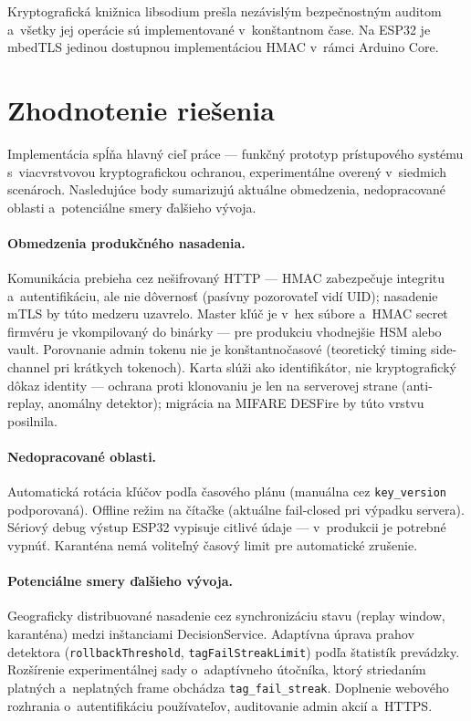 \documentclass[a4paper]{feidipsp}
\begin{document}
\noindent Kryptografická knižnica libsodium\cite{LibsodiumDoc} prešla nezávislým bezpečnostným auditom\cite{LibsodiumAudit} a~všetky jej operácie sú implementované v~konštantnom čase\cite{Bernstein2012}. Na ESP32 je mbedTLS jedinou dostupnou implementáciou HMAC v~rámci Arduino Core.

\section{Zhodnotenie riešenia}

Implementácia spĺňa hlavný cieľ práce --- funkčný prototyp prístupového systému s~viacvrstvovou kryptografickou ochranou, experimentálne overený v~siedmich scenároch. Nasledujúce body sumarizujú aktuálne obmedzenia, nedopracované oblasti a~potenciálne smery ďalšieho vývoja.

\paragraph{Obmedzenia produkčného nasadenia.}
Komunikácia prebieha cez nešifrovaný HTTP --- HMAC zabezpečuje integritu a~autentifikáciu, ale nie dôvernosť (pasívny pozorovateľ vidí UID); nasadenie mTLS\cite{RFC8446} by túto medzeru uzavrelo. Master kľúč je v~hex súbore a~HMAC secret firmvéru je vkompilovaný do binárky --- pre produkciu vhodnejšie HSM alebo vault\cite{NIST80057}. Porovnanie admin tokenu nie je konštantnočasové (teoretický timing side-channel pri krátkych tokenoch). Karta slúži ako identifikátor, nie kryptografický dôkaz identity --- ochrana proti klonovaniu je len na serverovej strane (anti-replay, anomálny detektor); migrácia na MIFARE DESFire\cite{GarciaMIFARE2008} by túto vrstvu posilnila.

\paragraph{Nedopracované oblasti.}
Automatická rotácia kľúčov podľa časového plánu (manuálna cez \texttt{key\_version} podporovaná). Offline režim na čítačke (aktuálne fail-closed pri výpadku servera). Sériový debug výstup ESP32 vypisuje citlivé údaje --- v~produkcii je potrebné vypnúť. Karanténa nemá voliteľný časový limit pre automatické zrušenie.

\paragraph{Potenciálne smery ďalšieho vývoja.}
Geograficky distribuované nasadenie cez synchronizáciu stavu (replay window, karanténa) medzi inštanciami DecisionService. Adaptívna úprava prahov detektora (\texttt{rollbackThreshold}, \texttt{tagFailStreakLimit}) podľa štatistík prevádzky. Rozšírenie experimentálnej sady o~adaptívneho útočníka, ktorý striedaním platných a~neplatných frame obchádza \texttt{tag\_fail\_streak}. Doplnenie webového rozhrania o~autentifikáciu používateľov, auditovanie admin akcií a~HTTPS.
\end{document}
